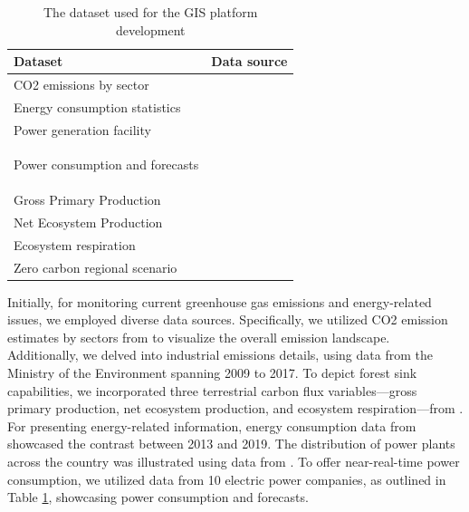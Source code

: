 \begin{table}[!ht]
    \centering
    \caption{The dataset used for the GIS platform development}
    \begin{adjustbox}{width=\textwidth}
        \begin{tabular}{l l}
        \hline
            Dataset & Data source \\ \hline
            CO2 emissions by sector & \citep{env2022} \\ \hline
            Energy consumption statistics & \citep{Toshihiko} \\ \hline
            Power generation facility & \citep{nlftp} \\ \hline
            \multirow{10}{*}{Power consumption and forecasts} & \citep{hokkaido} \\
            ~ & \citep{tohoku} \\
            ~ & \citep{Tokyo} \\
            ~ & \citep{Chubu} \\
            ~ & \citep{Hokuriku} \\
            ~ & \citep{Kansai} \\
            ~ & \citep{Chugoku} \\
            ~ & \citep{Shikoku} \\
            ~ & \citep{Kyushu} \\
            ~ & \citep{Okinawa} \\ \hline
            Gross Primary Production & \multirow{3}{*}{\citep{ito2019disequilibrium}} \\
            Net Ecosystem Production & ~ \\
            Ecosystem respiration & ~ \\ \hline
            Zero carbon regional scenario & \citep{zerocarbon} \\
            \hline
        \end{tabular}
    \end{adjustbox}
    \label{tab:chap7_tab1}
\end{table}

Initially, for monitoring current greenhouse gas emissions and energy-related issues, we employed diverse data sources. Specifically, we utilized CO2 emission estimates by sectors from \citep{env2022} to visualize the overall emission landscape. Additionally, we delved into industrial emissions details, using data from the Ministry of the Environment spanning 2009 to 2017. To depict forest sink capabilities, we incorporated three terrestrial carbon flux variables—gross primary production, net ecosystem production, and ecosystem respiration—from \citep{ito2019disequilibrium}. For presenting energy-related information, energy consumption data from \citep{Toshihiko} showcased the contrast between 2013 and 2019. The distribution of power plants across the country was illustrated using data from \citep{nlftp}. To offer near-real-time power consumption, we utilized data from 10 electric power companies, as outlined in Table \ref{tab:chap7_tab1}, showcasing power consumption and forecasts.\par

